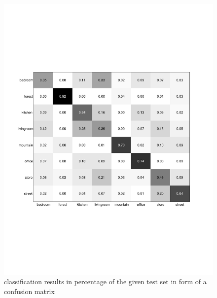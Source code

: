 \documentclass[subfigure,epsfig,fleqn,float,numbers=noenddot]{scrartcl}
\begin{document}
\begin{figure}
		\centering
		\includegraphics[width=\textwidth]{img/conf_matrix_test.pdf}
		\caption{classification results in percentage of the given test set in form of a confusion matrix}
		\label{fig:conf_matrix_test}
\end{figure}
\end{document}

